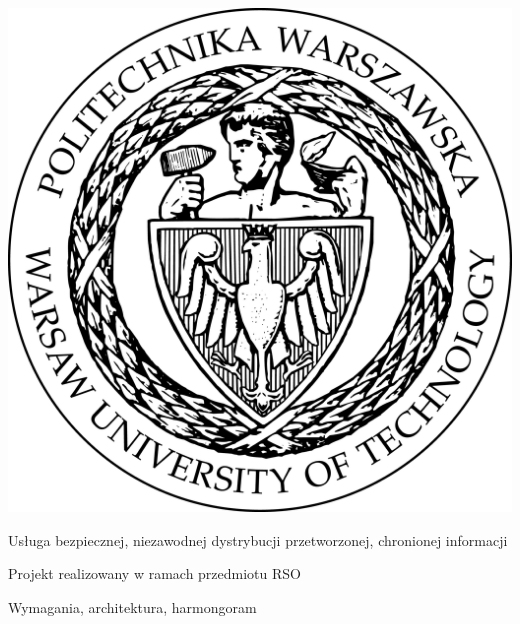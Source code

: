 \documentclass[a4paper,11pt]{article}
\author{
  Tomasz Pęksa \\
  Paweł Stiasny
}
\date{28 kwietnia 2016}
\begin{document}
\makeatletter
\begin{titlepage}

\begin{center}
  \includegraphics[scale=0.1]{Logo_PW_black.png} \\
  \vspace{50pt}
  
  {\LARGE Usługa bezpiecznej, niezawodnej dystrybucji przetworzonej, chronionej informacji} \\
  \vspace{10pt}
  
  {\large Projekt realizowany w ramach przedmiotu RSO} \\
  \vspace{40pt}
  
  {\Huge Wymagania, architektura, harmongoram} \\
  \vspace{30pt}
  
  {\@author} \\
  \vspace{10pt}
  
  {\@date}
\end{center}

\end{titlepage}
\makeatother

\tableofcontents
\newpage
\end{document}

